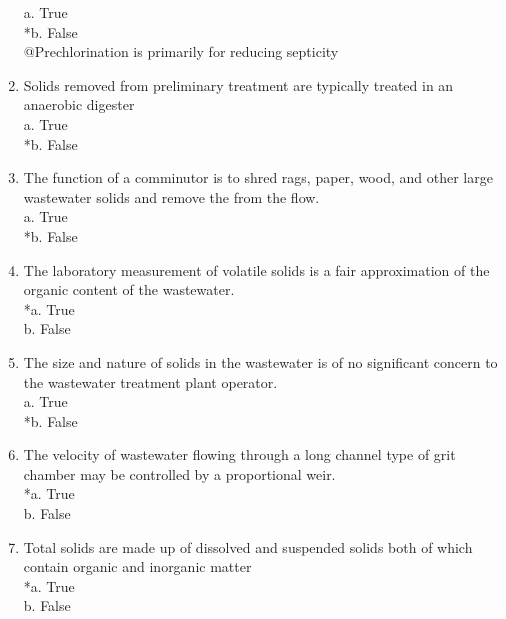 \begin{enumerate}
a. True \\
*b. False\\
@Prechlorination is primarily for reducing septicity 

\vspace{0.4cm}
\item  Solids removed from preliminary treatment are typically treated in an anaerobic digester \\

a. True \\
*b. False 

\vspace{0.4cm}
\item  The function of a comminutor is to shred rags, paper, wood, and other large wastewater solids and remove the from the flow. \\

a. True \\
*b. False 

\vspace{0.4cm}
\item  The laboratory measurement of volatile solids is a fair approximation of the organic content of the wastewater. \\

*a. True \\
b. False 

\vspace{0.4cm}
\item  The size and nature of solids in the wastewater is of no significant concern to the wastewater treatment plant operator. \\

a. True \\
*b. False 

\vspace{0.4cm}
\item  The velocity of wastewater flowing through a long channel type of grit chamber may be controlled by a proportional weir. \\

*a. True \\
b. False 

\vspace{0.4cm}
\item  Total solids are made up of dissolved and suspended solids both of which contain organic and inorganic matter \\

*a. True \\
b. False 


\end{enumerate}
